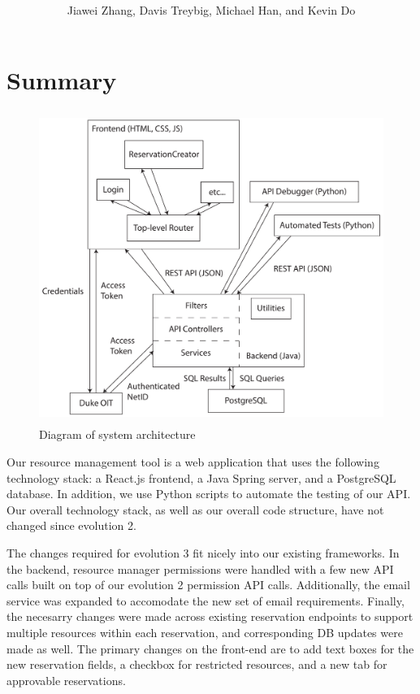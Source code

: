 \documentclass[12pt]{article}
\title{\horrule{5pt}\\\vspace{0.4cm}{\bf \mytitle}\\}
\author{Jiawei Zhang, Davis Treybig, Michael Han, and Kevin Do}
\date{\horrule{1pt}}
\begin{document}
\maketitle{}
\section{Summary}
\begin{figure}[h]
\begin{center}
\includegraphics[height=4in]{../ev2/ev2_design_cropped.pdf}
\end{center}
\caption{Diagram of system architecture}
\label{fig:design}
\end{figure}

Our resource management tool is a web application that uses the following technology stack: a React.js frontend, a Java Spring server, and a PostgreSQL database. In addition, we use Python scripts to automate the testing of our API. Our overall technology stack, as well as our overall code structure, have not changed since evolution 2. 

The changes required for evolution 3 fit nicely into our existing frameworks. In the backend, resource manager permissions were handled with a few new API calls built on top of our evolution 2 permission API calls. Additionally, the email service was expanded to accomodate the new set of email requirements. Finally, the necesarry changes were made across existing reservation endpoints to support multiple resources within each reservation, and corresponding DB updates were made as well. The primary changes on the front-end are to add text boxes for the new reservation fields, a checkbox for restricted resources, and a new tab for approvable reservations.
\end{document}
